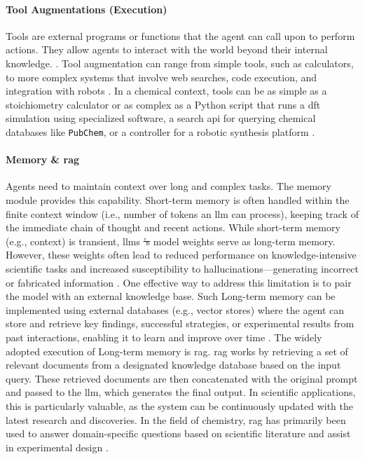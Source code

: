 \documentclass[11pt, oneside]{article}
\makeatletter
\newcommand{\modelname}[1]{\texttt{#1}}
\providecommand{\DIFdeltex}[1]{{\protect\color{red}\sout{#1}}} %
\providecommand{\DIFdelbegin}{} %
\providecommand{\DIFdelend}{} %
\providecommand{\DIFdel}[1]{\texorpdfstring{\DIFdeltex{#1}}{}} %
\newcommand{\DIFscaledelfig}{0.5}
\newlength{\DIFdelgraphicswidth} %
\newlength{\DIFdelgraphicsheight} %
\newcommand{\DIFdelincludegraphics}[2][]{%
\sbox{\DIFdelgraphicsbox}{\DIFOincludegraphics[#1]{#2}}%
\settoboxwidth{\DIFdelgraphicswidth}{\DIFdelgraphicsbox} %
\settoboxtotalheight{\DIFdelgraphicsheight}{\DIFdelgraphicsbox} %
\scalebox{\DIFscaledelfig}{%
\parbox[b]{\DIFdelgraphicswidth}{\usebox{\DIFdelgraphicsbox}\\[-\baselineskip] \rule{\DIFdelgraphicswidth}{0em}}\llap{\resizebox{\DIFdelgraphicswidth}{\DIFdelgraphicsheight}{%
\setlength{\unitlength}{\DIFdelgraphicswidth}%
\begin{picture}(1,1)%
\thicklines\linethickness{2pt} %
{\color[rgb]{1,0,0}\put(0,0){\framebox(1,1){}}}%
{\color[rgb]{1,0,0}\put(0,0){\line( 1,1){1}}}%
{\color[rgb]{1,0,0}\put(0,1){\line(1,-1){1}}}%
\end{picture}%
}\hspace*{3pt}}} %
} %
\DeclareRobustCommand{\DIFdelbegin}{\DIFOdelbegin \let\includegraphics\DIFdelincludegraphics} %
\DeclareRobustCommand{\DIFdelend}{\DIFOaddend \let\includegraphics\DIFOincludegraphics} %
\let\sout@orig\sout %
\renewcommand{\sout}[1]{\ifmmode\text{\sout@orig{\ensuremath{#1}}}\else\sout@orig{#1}\fi} %
\makeatother
\begin{document}
\paragraph{Tool Augmentations (Execution)}
\label{sec:tool_augmentation}
Tools are external programs or functions that the agent can call upon to perform actions. They allow agents to interact with the world beyond their internal knowledge. \autocite{schick2023toolformer, parisi2022talm}. Tool augmentation can range from simple tools, such as calculators, to more complex systems that involve web searches, code execution, and integration with robots \autocite{darvish2025organa, chan2024mle, wei2025browsecomp}. In a chemical context, tools can be as simple as a stoichiometry calculator or as complex as a Python script that runs a \gls{dft} simulation using specialized software, a search \gls{api} for querying chemical databases like \modelname{PubChem}, or a controller for a robotic synthesis platform \autocite{boiko2023autonomous, darvish2025organa, bran2024augmenting}.

\paragraph{Memory \& \gls{rag} }
\label{sec:rag}
Agents need to maintain context over long and complex tasks. The memory module provides this capability. Short-term memory is often handled within the finite context window (i.e., number of tokens an \gls{llm} can process), keeping track of the immediate chain of thought and recent actions.
While short-term memory (e.g., context) is transient, \glspl{llm} \DIFdelbegin \DIFdel{'s }\DIFdelend model weights serve as long-term memory. However, these weights often lead to reduced performance on knowledge-intensive scientific tasks and increased susceptibility to hallucinations---generating incorrect or fabricated information \autocite{marcus2020next}.
One effective way to address this limitation is to pair the model with an external knowledge base.\autocite{lewis2020retrieval} Such Long-term memory can be implemented using external databases (e.g., vector stores) where the agent can store and retrieve key findings, successful strategies, or experimental results from past interactions, enabling it to learn and improve over time \autocite{chen2023chemist}. The widely adopted execution of Long-term memory is \gls{rag}. \gls{rag} works by retrieving a set of relevant documents from a designated knowledge database based on the input query. These retrieved documents are then concatenated with the original prompt and passed to the \gls{llm}, which generates the final output. In scientific applications, this is particularly valuable, as the system can be continuously updated with the latest research and discoveries. In the field of chemistry, \gls{rag} has primarily been used to answer domain-specific questions based on scientific literature and assist in experimental design \autocite{chen2023chemist, skarlinski2024language}.
\end{document}

